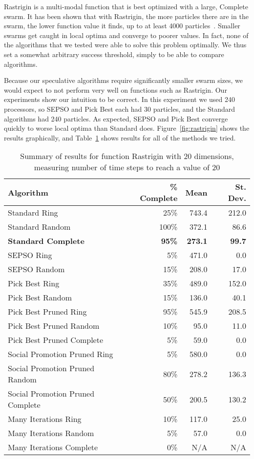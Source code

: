 \documentclass[smallcondensed]{svjour3}
\newcommand{\fig}[1]{Figure~\ref{fig:#1}}
\newcommand{\tabref}[1]{Table~\ref{tab:#1}}
\begin{document}
Rastrigin is a multi-modal function that is best optimized with a large,
Complete swarm.  It has been shown that with Rastrigin, the more particles
there are in the swarm, the lower function value it finds, up to at least 4000
particles~\citep{mcnabb-2009-large-particle-swarms}.  Smaller swarms get caught
in local optima and converge to poorer values.  In fact, none of the algorithms
that we tested were able to solve this problem optimally.  We thus set a
somewhat arbitrary success threshold, simply to be able to compare algorithms.

Because our speculative algorithms require significantly smaller swarm sizes,
we would expect to not perform very well on functions such as Rastrigin.  Our
experiments show our intuition to be correct.  In this experiment we used 240
processors, so SEPSO and Pick Best each had 30 particles, and the Standard
algorithms had 240 particles.  As expected, SEPSO and Pick Best converge
quickly to worse local optima than Standard does.  \fig{rastrigin} shows the
results graphically, and \tabref{rastrigin-20} shows results for all of the
methods we tried.

\begin{table}
  \caption{Summary of results for function Rastrigin with 20 dimensions,
  measuring number of time steps to reach a value of 20}
  \label{tab:rastrigin-20}
  \centering
  \begin{tabular}{|l|r|r|r|}
  \hline
  Algorithm&\% Complete&Mean&St. Dev.\\
  \hline
  \hline
  Standard Ring&25\%&743.4&212.0\\
  \hline
  Standard Random&100\%&372.1&86.6\\
  \hline
  \textbf{Standard Complete}&\textbf{95\%}&\textbf{273.1}&\textbf{99.7}\\
  \hline
  SEPSO Ring&5\%&471.0&0.0\\
  \hline
  SEPSO Random&15\%&208.0&17.0\\
  \hline
  Pick Best Ring&35\%&489.0&152.0\\
  \hline
  Pick Best Random&15\%&136.0&40.1\\
  \hline
  Pick Best Pruned Ring&95\%&545.9&208.5\\
  \hline
  Pick Best Pruned Random&10\%&95.0&11.0\\
  \hline
  Pick Best Pruned Complete&5\%&59.0&0.0\\
  \hline
  Social Promotion Pruned Ring&5\%&580.0&0.0\\
  \hline
  Social Promotion Pruned Random&80\%&278.2&136.3\\
  \hline
  Social Promotion Pruned Complete&50\%&200.5&130.2\\
  \hline
  Many Iterations Ring&10\%&117.0&25.0\\
  \hline
  Many Iterations Random&5\%&57.0&0.0\\
  \hline
  Many Iterations Complete&0\%&N/A&N/A\\
  \hline
  \end{tabular}
\end{table}
\end{document}
